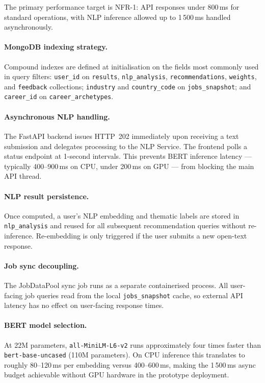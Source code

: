 The primary performance target is NFR-1: API responses under 800\,ms for
standard operations, with NLP inference allowed up to 1\,500\,ms handled
asynchronously.

\paragraph{MongoDB indexing strategy.}
Compound indexes are defined at initialisation on the fields most commonly used
in query filters: \texttt{user\_id} on \texttt{results}, \texttt{nlp\_analysis},
\texttt{recommendations}, \texttt{weights}, and \texttt{feedback} collections;
\texttt{industry} and \texttt{country\_code} on \texttt{jobs\_snapshot}; and
\texttt{career\_id} on \texttt{career\_archetypes}.

\paragraph{Asynchronous NLP handling.}
The FastAPI backend issues HTTP~202 immediately upon receiving a text submission
and delegates processing to the NLP Service. The frontend polls a status
endpoint at 1-second intervals. This prevents BERT inference latency ---
typically 400--900\,ms on CPU, under 200\,ms on GPU --- from blocking the
main API thread.

\paragraph{NLP result persistence.}
Once computed, a user's NLP embedding and thematic labels are stored in
\texttt{nlp\_analysis} and reused for all subsequent recommendation queries
without re-inference. Re-embedding is only triggered if the user submits a
new open-text response.

\paragraph{Job sync decoupling.}
The JobDataPool sync job runs as a separate containerised process. All
user-facing job queries read from the local \texttt{jobs\_snapshot} cache,
so external API latency has no effect on user-facing response times.

\paragraph{BERT model selection.}
At 22M parameters, \texttt{all-MiniLM-L6-v2} runs approximately four times
faster than \texttt{bert-base-uncased} (110M parameters). On CPU inference
this translates to roughly 80--120\,ms per embedding versus 400--600\,ms,
making the 1\,500\,ms async budget achievable without GPU hardware in the
prototype deployment.

